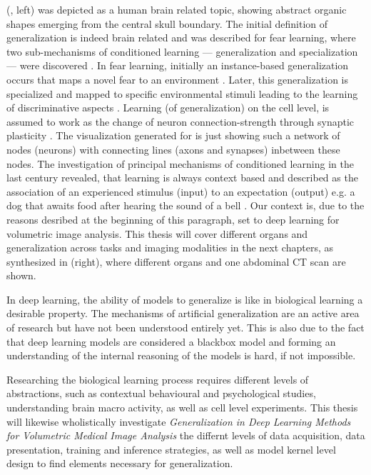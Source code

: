      (, left) was depicted as a human brain related topic, showing abstract organic shapes emerging from the central skull boundary.
    The initial definition of generalization is indeed brain related and was described for fear learning, where two sub-mechanisms of conditioned learning --- generalization and specialization --- were discovered \citep{xx, banich2011generalization}. %
    In fear learning, initially an instance-based generalization occurs that maps a novel fear to an environment \citep{banich2011generalization}. Later, this generalization is specialized and mapped to specific environmental stimuli leading to the learning of discriminative aspects \citep{banich2011generalization}.
    Learning (of generalization) on the cell level, is assumed to work as the change of neuron connection-strength through synaptic plasticity \citep{do1949organization,martin2000synaptic}. The visualization generated for  is just showing such a network of nodes (neurons) with connecting lines (axons and synapses) inbetween these nodes.
    The investigation of principal mechanisms of conditioned learning in the last century revealed, that learning is always context based and described as the association of an experienced stimulus (input) to an expectation (output) e.g. a dog that awaits food after hearing the sound of a bell \citep{pavlov1928conditioned, pavlov2010conditioned, banich2011generalization}.
    Our context is, due to the reasons desribed at the beginning of this paragraph, set to deep learning for volumetric image analysis. This thesis will cover different organs and generalization across tasks and imaging modalities in the next chapters, as synthesized in  (right), where different organs and one abdominal \ac{CT} scan are shown. %

    In deep learning, the ability of models to generalize is like in biological learning a desirable property. The mechanisms of artificial generalization are an active area of research but have not been understood entirely yet. This is also due to the fact that deep learning models are considered a blackbox model and forming an understanding of the internal reasoning of the models is hard, if not impossible.

    Researching the biological learning process requires different levels of abstractions, such as contextual behavioural and psychological studies, understanding brain macro activity, as well as cell level experiments.
    This thesis will likewise wholistically investigate \emph{Generalization in Deep Learning Methods for Volumetric Medical Image Analysis} the  differnt levels of data acquisition, data presentation, training and inference strategies, as well as model kernel level design to find elements necessary for generalization.

